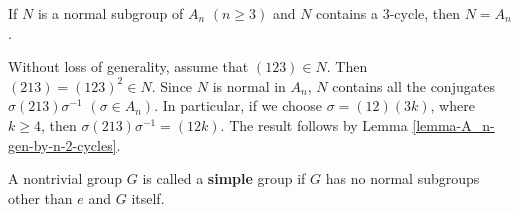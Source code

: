 \begin{lemma} \label{lemma-A_n-contains-3-cycle}
	If $N$ is a normal subgroup of $A_n$ $(n\geq 3)$ and $N$ contains a $3$-cycle, then $N=A_n$.
\end{lemma}
\begin{sketch}
	Without loss of generality, assume that  $(123)\in N$. Then $(213) = (123)^2\in N$. Since $N$ is normal in $A_n$, $N$ contains all the conjugates $\sigma (213)\sigma^{-1}$ $(\sigma\in A_n)$. In particular, if we choose $\sigma = (12)(3k) $, where $k\geq 4$, then $\sigma (213)\sigma^{-1} = (12k)$. The result follows by Lemma \ref{lemma-A_n-gen-by-n-2-cycles}.
\end{sketch}
\newpage
\begin{definition}
	A nontrivial group $G$ is called a \textbf{simple} group if $G$ has no normal subgroups other than $e$ and $G$ itself.
\end{definition}

